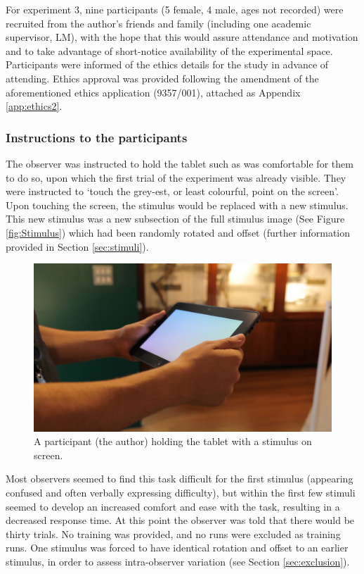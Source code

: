 For experiment 3, nine participants (5 female, 4 male, ages not recorded) were recruited from the author's friends and family (including one academic supervisor, LM), with the hope that this would assure attendance and motivation and to take advantage of short-notice availability of the experimental space. Participants were informed of the ethics details for the study in advance of attending. Ethics approval was provided following the amendment of the aforementioned ethics application (9357/001), attached as Appendix \ref{app:ethics2}.

\subsubsection{Instructions to the participants}

The observer was instructed to hold the tablet such as was comfortable for them to do so, upon which the first trial of the experiment was already visible. They were instructed to `touch the grey-est, or least colourful, point on the screen'. Upon touching the screen, the stimulus would be replaced with a new stimulus. This new stimulus was a new subsection of the full stimulus image (See Figure \ref{fig:Stimulus}) which had been randomly rotated and offset (further information provided in Section \ref{sec:stimuli}).

\begin{figure}[hbtp]
\includegraphics[max width=\textwidth]{figs/tablet/MVI_3213-1.jpg} %
\caption{A participant (the author) holding the tablet with a stimulus on screen.}
\label{fig:grant_demo}
\end{figure}

Most observers seemed to find this task difficult for the first stimulus (appearing confused and often verbally expressing difficulty), but within the first few stimuli seemed to develop an increased comfort and ease with the task, resulting in a decreased response time. %
At this point the observer was told that there would be thirty trials. No training was provided, and no runs were excluded as training runs. One stimulus was forced to have identical rotation and offset to an earlier stimulus, in order to assess intra-observer variation (see Section \ref{sec:exclusion}).

